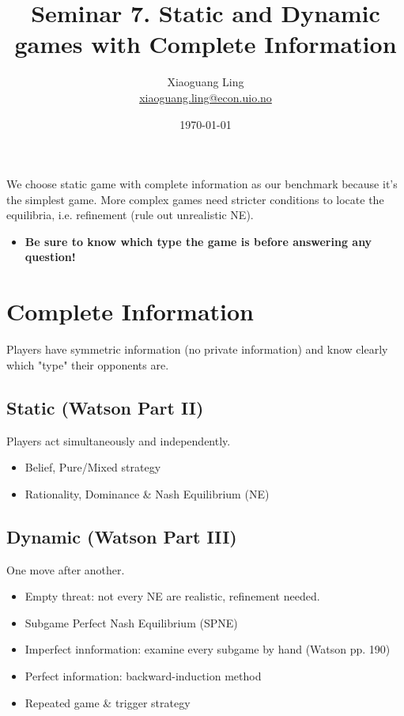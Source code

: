 \documentclass{article}
\title{Seminar 7. Static and Dynamic games with Complete Information}
\author{Xiaoguang Ling \\  \href{xiaoguang.ling@econ.uio.no}{xiaoguang.ling@econ.uio.no}}
\date{\today}
\begin{document}
\maketitle

\begin{mdframed}[backgroundcolor=blue!20,linecolor=white]

We choose static game with complete information as our benchmark 
because it's the simplest game. More complex games need stricter conditions to locate the equilibria, i.e. refinement (rule out unrealistic NE). 
\begin{itemize}
\item \textbf{Be sure to know which type the game is before answering
any question!}
\end{itemize}

\section*{Complete Information}

Players have symmetric information (no private information) and
know clearly which "type" their opponents are.


\subsection*{\hspace{4mm} Static (Watson Part II)}
\hspace{4mm} Players act simultaneously and independently.
\begin{itemize}
\item Belief, Pure/Mixed strategy
\item Rationality, Dominance \& Nash Equilibrium (NE)

\end{itemize}

\subsection*{\hspace{4mm} Dynamic (Watson Part III)}
\hspace{4mm} One move after another.
\begin{itemize}	
\item Empty threat: not every NE are realistic, refinement needed.
\item Subgame Perfect Nash Equilibrium (SPNE)
\item Imperfect innformation: examine every subgame by hand (Watson pp. 190)
\item Perfect information: backward-induction method
\item Repeated game \& trigger strategy
\end{itemize}


\end{mdframed}
\end{document}
